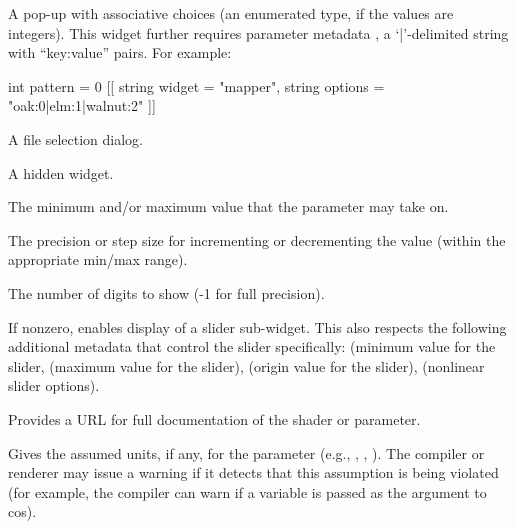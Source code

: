 \documentclass[11pt,letterpaper]{book}
\begin{document}
\vspace{12pt}
A pop-up with associative choices (an enumerated type, if the values
are integers).  This widget further requires
parameter metadata , a `{\cf |}'-delimited string with
``key:value'' pairs.  For example:
\begin{code}
    int pattern = 0
        [[ string widget = "mapper",
           string options = "oak:0|elm:1|walnut:2" ]]
\end{code}
\apiend
\vspace{-16pt}

\vspace{12pt}
A file selection dialog.
\apiend
\vspace{-16pt}

\vspace{12pt}
A hidden widget.
\apiend
\vspace{-16pt}

\apiend

The minimum and/or maximum value that the parameter may take on.
\apiend

The precision or step size for incrementing or decrementing the value
(within the appropriate min/max range).
\apiend

The number of digits to show (-1 for full precision).
\apiend

If nonzero, enables display of a slider sub-widget.  This also respects
the following additional metadata that control the slider specifically:
 (minimum value for the slider,  (maximum
value for the slider),  (origin value for
the slider),  (nonlinear slider options).
\apiend

Provides a URL for full documentation of the shader or parameter.
\apiend

Gives the assumed units, if any, for the parameter (e.g., ,
, ).
The compiler or renderer may issue a warning if it detects that this
assumption is being violated (for example, the compiler can warn
if a  variable is passed as the argument to {\cf cos}).
\apiend
\end{document}
